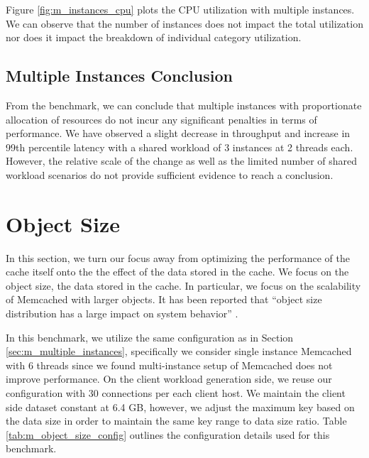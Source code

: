 Figure \ref{fig:m_instances_cpu} plots the CPU utilization with multiple instances. We can observe that the number of instances does not impact the total utilization nor does it impact the breakdown of individual category utilization.

\subsection{Multiple Instances Conclusion}
From the benchmark, we can conclude that multiple instances with proportionate allocation of resources do not incur any significant penalties in terms of performance. We have observed a slight decrease in throughput and increase in 99th percentile latency with a shared workload of 3 instances at 2 threads each. However, the relative scale of the change as well as the limited number of shared workload scenarios do not provide sufficient evidence to reach a conclusion.


\section{Object Size}
\label{sec:m_object_size}
In this section, we turn our focus away from optimizing the performance of the cache itself onto the the effect of the data stored in the cache. We focus on the object size, the data stored in the cache. In particular, we focus on the scalability of Memcached with larger objects. It has been reported that ``object size distribution has a large impact on system behavior'' \cite{lim2013thin}.

In this benchmark, we utilize the same configuration as in Section \ref{sec:m_multiple_instances}, specifically we consider single instance Memcached with 6 threads since we found multi-instance setup of Memcached does not improve performance. On the client workload generation side, we reuse our configuration with 30 connections per each client host. We maintain the client side dataset constant at 6.4 GB, however, we adjust the maximum key based on the data size in order to maintain the same key range to data size ratio. Table \ref{tab:m_object_size_config} outlines the configuration details used for this benchmark.

